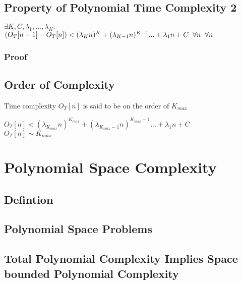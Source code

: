 \documentclass[11pt]{article}
\begin{document}
\subsection{Property of Polynomial Time Complexity 2}
\begin{center}
$
\exists K,C,\lambda_1,...,\lambda_K :
$
\\ \vspace{2mm}
$
(O_T[n+1] - O_T[n]) <  (\lambda_K n)^K + (\lambda_{K-1} n)^{K-1}... + \lambda_1 n + C \hspace{2mm} \forall n \hspace{2mm} \forall n
$
\end{center}
\subsubsection{Proof}




\subsection{Order of Complexity}
Time complexity $O_T[n]$ is said to be on the order of $K_{max}$
\begin{center}
$
O_T[n] < (\lambda_{K_{max}} n)^{K_{max}} + (\lambda_{K_{max}-1} n)^{K_{max}-1}... + \lambda_1 n + C
$
\\ \vspace{2mm}
$
O_T[n] \sim K_{max}
$
\end{center}


















\newpage
\section{Polynomial Space Complexity}
\subsection{Defintion}
\subsection{Polynomial Space Problems}
\subsection{Total Polynomial Complexity Implies Space bounded Polynomial Complexity}
\end{document}
